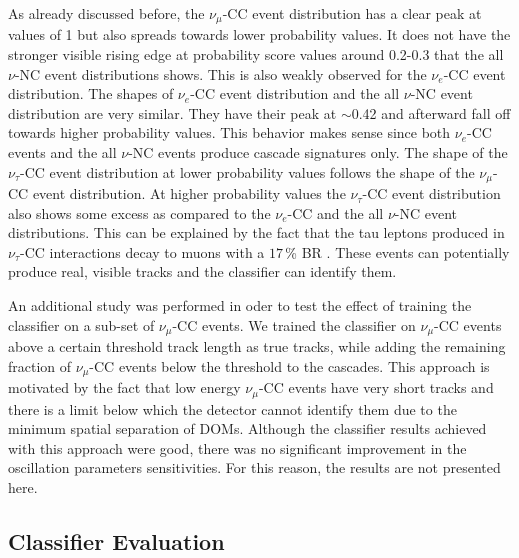 As already discussed before, the $\nu_\mu$-CC event distribution has a clear peak at values of 1 but also spreads towards lower probability values.
It does not have the stronger visible rising edge at probability score values around 0.2-0.3 that the all $\nu$-NC event distributions shows.
This is also weakly observed for the $\nu_e$-CC event distribution. 
The shapes of $\nu_e$-CC event distribution and the all $\nu$-NC event distribution are very similar.
They have their peak at $\sim$0.42 and afterward fall off towards higher probability values.
This behavior makes sense since both $\nu_e$-CC events and the all $\nu$-NC events produce cascade signatures only.
The shape of the $\nu_\tau$-CC event distribution at lower probability values follows the shape of the $\nu_\mu$-CC event distribution.
At higher probability values the $\nu_\tau$-CC event distribution also shows some excess as compared to the $\nu_e$-CC and the all $\nu$-NC event distributions.
This can be explained by the fact that the tau leptons produced in $\nu_\tau$-CC interactions decay to muons with a $17$\,\% BR \cite{PhysRevD.98.030001}.
These events can potentially produce real, visible tracks and the classifier can identify them.

An additional study was performed in oder to test the effect of training the classifier on a sub-set of $\nu_\mu$-CC events.
We trained the classifier on $\nu_\mu$-CC events above a certain threshold track length as true tracks, while adding the remaining fraction of $\nu_\mu$-CC events below the threshold to the cascades.
This approach is motivated by the fact that low energy $\nu_\mu$-CC events have very short tracks and there is a limit below which the detector cannot identify them due to the minimum spatial separation of DOMs.
Although the classifier results achieved with this approach were good, there was no significant improvement in the oscillation parameters sensitivities.
For this reason, the results are not presented here.


\subsection{Classifier Evaluation}

